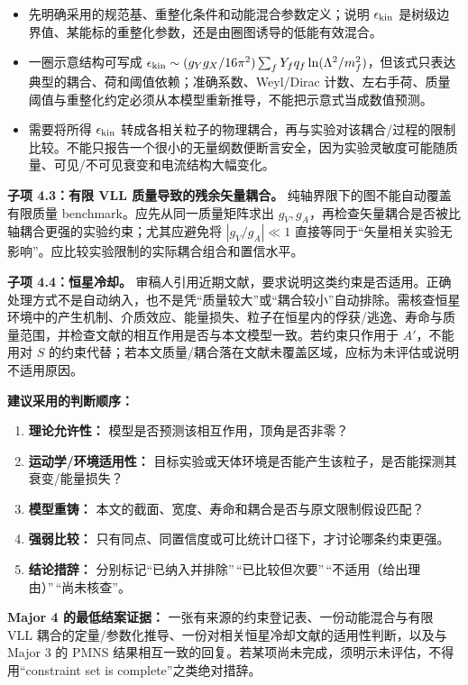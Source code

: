 \documentclass[
  chinese,
  UTF8]{ctexart}
\providecommand{\tightlist}{%
  \setlength{\itemsep}{0pt}\setlength{\parskip}{0pt}}
\begin{document}
\begin{itemize}
\tightlist
\item
  先明确采用的规范基、重整化条件和动能混合参数定义；说明
  \(\epsilon_{\rm kin}\)
  是树级边界值、某能标的重整化参数，还是由圈图诱导的低能有效混合。
\item
  一圈示意结构可写成
  \(\epsilon_{\rm kin}\sim(g_Yg_X/16\pi^2)\sum_f Y_fq_f\ln(\Lambda^2/m_f^2)\)，但该式只表达典型的耦合、荷和阈值依赖；准确系数、Weyl/Dirac
  计数、左右手荷、质量阈值与重整化约定必须从本模型重新推导，不能把示意式当成数值预测。
\item
  需要将所得 \(\epsilon_{\rm kin}\)
  转成各相关粒子的物理耦合，再与实验对该耦合/过程的限制比较。不能只报告一个很小的无量纲数便断言安全，因为实验灵敏度可能随质量、可见/不可见衰变和电流结构大幅变化。
\end{itemize}

\textbf{子项 4.3：有限 VLL 质量导致的残余矢量耦合。}
纯轴界限下的图不能自动覆盖有限质量 benchmark。应先从同一质量矩阵求出
\(g_V,g_A\)，再检查矢量耦合是否被比轴耦合更强的实验约束；尤其应避免将
\(|g_V/g_A|\ll1\)
直接等同于``矢量相关实验无影响''。应比较实验限制的实际耦合组合和置信水平。

\textbf{子项 4.4：恒星冷却。}
审稿人引用近期文献，要求说明这类约束是否适用。正确处理方式不是自动纳入，也不是凭``质量较大''或``耦合较小''自动排除。需核查恒星环境中的产生机制、介质效应、能量损失、粒子在恒星内的俘获/逃逸、寿命与质量范围，并检查文献的相互作用是否与本文模型一致。若约束只作用于
\(A'\)，不能用对 \(S\)
的约束代替；若本文质量/耦合落在文献未覆盖区域，应标为未评估或说明不适用原因。

\textbf{建议采用的判断顺序：}

\begin{enumerate}
\def\labelenumi{\arabic{enumi}.}
\tightlist
\item
  \textbf{理论允许性：} 模型是否预测该相互作用，顶角是否非零？
\item
  \textbf{运动学/环境适用性：}
  目标实验或天体环境是否能产生该粒子，是否能探测其衰变/能量损失？
\item
  \textbf{模型重铸：}
  本文的截面、宽度、寿命和耦合是否与原文限制假设匹配？
\item
  \textbf{强弱比较：}
  只有同点、同置信度或可比统计口径下，才讨论哪条约束更强。
\item
  \textbf{结论措辞：}
  分别标记``已纳入并排除''\,``已比较但次要''\,``不适用（给出理由）''\,``尚未核查''。
\end{enumerate}

\textbf{Major 4 的最低结案证据：}
一张有来源的约束登记表、一份动能混合与有限 VLL
耦合的定量/参数化推导、一份对相关恒星冷却文献的适用性判断，以及与 Major
3 的 PMNS
结果相互一致的回复。若某项尚未完成，须明示未评估，不得用``constraint set
is complete''之类绝对措辞。
\end{document}
